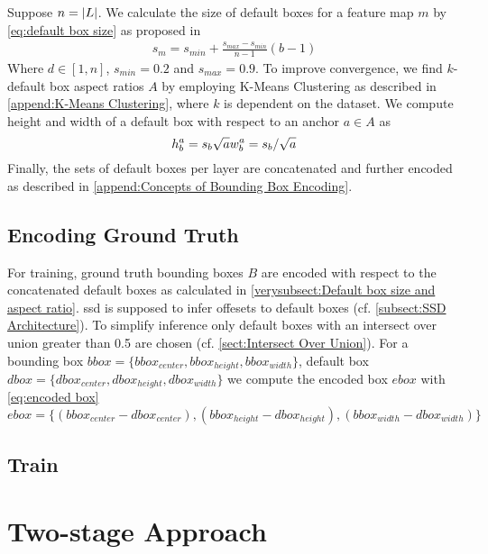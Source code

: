 \label{verysubsect:Default box size and aspect ratio}
Suppose \(n=\abs{L}\). We calculate the size of default boxes for a feature map \(m\) by \autoref{eq:default box size} as proposed in \cite{Liu.2016}
\begin{align}
    s_m=s_{min} + \frac{s_{max}-s_{min}}{n-1}(b-1)
\end{align}\label{eq:default box size}
Where \(d\in [1, n]\), \(s_{min}=0.2\) and \(s_{max}=0.9\). To improve 
convergence, we find \(k\)-default box aspect ratios \(A\) by employing K-Means 
Clustering as described in \autoref{append:K-Means Clustering}, where \(k\) is 
dependent on the dataset. We compute 
height and width of a default box with respect to an anchor \(a\in A\) as
\begin{equation}
    h_b^a=s_b\sqrt{a}\\
    w_b^a=s_b/\sqrt{a}
\end{equation}
Finally, the sets of default boxes per \gls{layer} are concatenated and further encoded as described in \autoref{append:Concepts of Bounding Box Encoding}. \subsection{Encoding Ground Truth} For training, ground truth bounding boxes \(B\) are encoded with respect to the concatenated default boxes as calculated in \autoref{verysubsect:Default box size and aspect ratio}. \gls{ssd} is supposed to infer offesets to default boxes (cf. \autoref{subsect:SSD Architecture}). To simplify inference only default boxes with an intersect over union greater than 0.5 are chosen (cf. \autoref{sect:Intersect Over Union}). For a bounding box \(bbox=\{bbox_{center}, bbox_{height}, bbox_{width}\}\), default box \(dbox=\{dbox_{center}, dbox_{height}, dbox_{width}\}\) we compute the encoded box \(ebox\) with \autoref{eq:encoded box}
\begin{equation}
    ebox=\{(bbox_{center}-dbox_{center}), (bbox_{height}-dbox_{height}), (bbox_{width}-dbox_{width})\}
\end{equation}\label{eq:encoded box}

\subsection{Train}
\blindtext[1]

\section{Two-stage Approach}
\blindtext[6]

